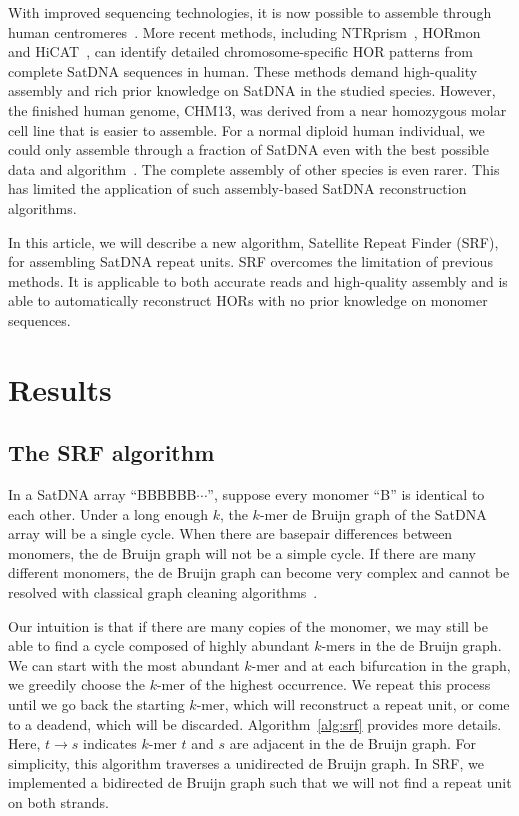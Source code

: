 \documentclass{bioinfo}
\begin{document}
With improved sequencing technologies, it is now possible to assemble through
human centromeres~\citep{Nurk:2022up}. More recent methods, including
NTRprism~\citep{Altemose:2022tv}, HORmon~\citep{Kunyavskaya:2022tx} and
HiCAT~\citep{Gao2022.08.07.502881}, can identify detailed
chromosome-specific HOR patterns from complete SatDNA sequences in human. These
methods demand high-quality assembly and rich prior knowledge on SatDNA in the
studied species. However, the finished human genome, CHM13, was derived from a
near homozygous molar cell line that is easier to assemble. For a normal
diploid human individual, we could only assemble through a fraction of SatDNA
even with the best possible data and
algorithm~\citep{Rautiainen:2023aa}. The complete assembly of other
species is even rarer. This has limited the application of such assembly-based
SatDNA reconstruction algorithms.

In this article, we will describe a new algorithm, Satellite Repeat Finder
(SRF), for assembling SatDNA repeat units. SRF overcomes the limitation of
previous methods. It is applicable to both accurate reads and high-quality
assembly and is able to automatically reconstruct HORs with no prior knowledge
on monomer sequences.

\section{Results}

\subsection{The SRF algorithm}

In a SatDNA array ``{\sf BBBBBB$\cdots$}'', suppose every monomer ``{\sf B}''
is identical to each other. Under a long enough $k$, the $k$-mer de Bruijn
graph of the SatDNA array will be a single cycle.  When there are
basepair differences between monomers, the de Bruijn graph will not be a simple cycle.
If there are many different monomers, the de Bruijn graph can become very
complex and cannot be resolved with classical graph cleaning
algorithms~\citep{Zerbino:2008uq}.

Our intuition is that if there are many copies of the monomer, we may still be
able to find a cycle composed of highly abundant $k$-mers in the de Bruijn
graph. We can start with the most abundant $k$-mer and at each bifurcation in
the graph, we greedily choose the $k$-mer of the highest occurrence. We repeat
this process until we go back the starting $k$-mer, which will reconstruct a
repeat unit, or come to a deadend, which will be discarded.
Algorithm~\ref{alg:srf} provides more details. Here, $t\to s$ indicates $k$-mer
$t$ and $s$ are adjacent in the de Bruijn graph. For simplicity, this algorithm
traverses a unidirected de Bruijn graph. In SRF, we implemented a bidirected
de Bruijn graph such that we will not find a repeat unit on both strands.
\end{document}
